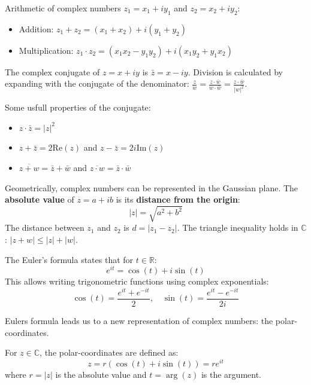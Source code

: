 \begin{definition}
Arithmetic of complex numbers $z_1 = x_1 + i y_1$ and $z_2 = x_2 + i y_2$:
\begin{itemize}
    \item Addition: $z_1 + z_2 = (x_1 + x_2) + i(y_1 + y_2)$
    \item Multiplication: $z_1 \cdot z_2 = (x_1 x_2 - y_1 y_2) + i(x_1 y_2 + y_1 x_2)$
\end{itemize}
The complex conjugate of $z = x + iy$ is $\bar{z} = x - iy$. Division is calculated by expanding with the conjugate of the denominator: $\frac{z}{w} = \frac{z \cdot \bar{w}}{w \cdot \bar{w}} = \frac{z \cdot \bar{w}}{|w|^2}$.
\end{definition}

\begin{remark}
Some usfull properties of the conjugate:
\begin{itemize}
    \item $z \cdot \bar{z} = |z|^2$
    \item $z + \bar{z} = 2\text{Re}(z)$ and $z - \bar{z} = 2i\text{Im}(z)$
    \item $\overline{z+w} = \bar{z} + \bar{w}$ and $\overline{z \cdot w} = \bar{z} \cdot \bar{w}$
\end{itemize}
\end{remark}

\begin{definition}
Geometrically, complex numbers can be represented in the Gaussian plane.
The \textbf{absolute value} of $z = a + ib$ is its \textbf{distance from the origin}:
$$|z| = \sqrt{a^2 + b^2}$$
The distance between $z_1$ and $z_2$ is $d = |z_1 - z_2|$.
The triangle inequality holds in $\mathbb{C}$: $|z + w| \leq |z| + |w|$.
\end{definition}

\begin{theorem}
The Euler's formula states that for $t \in \mathbb{R}$:
$$e^{it} = \cos(t) + i\sin(t)$$
This allows writing trigonometric functions using complex exponentials:
$$\cos(t) = \frac{e^{it} + e^{-it}}{2}, \quad \sin(t) = \frac{e^{it} - e^{-it}}{2i}$$
\end{theorem}

Eulers formula leads us to a new representation of complex numbers: the polar-coordinates.

\begin{definition}
For $z \in \mathbb{C}$, the polar-coordinates are defined as:
$$z = r(\cos(t) + i\sin(t)) = r e^{it}$$
where $r = |z|$ is the absolute value and $t = \arg(z)$ is the argument.
\end{definition}

